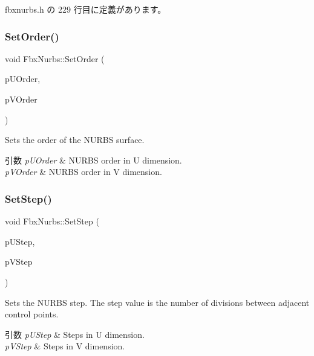  fbxnurbs.\+h の 229 行目に定義があります。

\mbox{\label{class_fbx_nurbs_a50b478b4c7feab9bf41b805f9893c598}} 
\subsubsection{\texorpdfstring{Set\+Order()}{SetOrder()}}
{\footnotesize\ttfamily void Fbx\+Nurbs\+::\+Set\+Order (\begin{DoxyParamCaption}\item[{\hyperlink{fbxtypes_8h_ae9fb141d8158a730aa85ec5ff2ea3f6b}{Fbx\+U\+Int}}]{p\+U\+Order,  }\item[{\hyperlink{fbxtypes_8h_ae9fb141d8158a730aa85ec5ff2ea3f6b}{Fbx\+U\+Int}}]{p\+V\+Order }\end{DoxyParamCaption})}

Sets the order of the N\+U\+R\+BS surface. 
\begin{DoxyParams}{引数}
{\em p\+U\+Order} & N\+U\+R\+BS order in U dimension. \\
\hline
{\em p\+V\+Order} & N\+U\+R\+BS order in V dimension. \\
\hline
\end{DoxyParams}
\mbox{\label{class_fbx_nurbs_a4b60585e7190d50e95947ddfcafd39a7}} 
\subsubsection{\texorpdfstring{Set\+Step()}{SetStep()}}
{\footnotesize\ttfamily void Fbx\+Nurbs\+::\+Set\+Step (\begin{DoxyParamCaption}\item[{int}]{p\+U\+Step,  }\item[{int}]{p\+V\+Step }\end{DoxyParamCaption})}

Sets the N\+U\+R\+BS step. The step value is the number of divisions between adjacent control points. 
\begin{DoxyParams}{引数}
{\em p\+U\+Step} & Steps in U dimension. \\
\hline
{\em p\+V\+Step} & Steps in V dimension. \\
\hline
\end{DoxyParams}
\mbox{\label{class_fbx_nurbs_a6687f58ab39b07a3ce686992e5d8c9f8}} 
